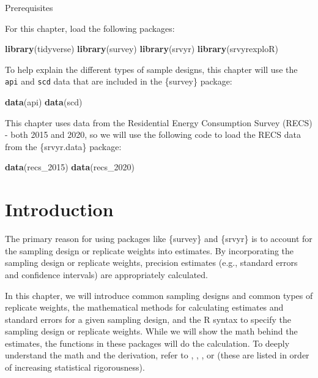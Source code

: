 \documentclass[
]{krantz}
\makeatletter
\newenvironment{Shaded}{\begin{snugshade}}{\end{snugshade}}
\newcommand{\FunctionTok}[1]{\textcolor[rgb]{0.27,0.27,0.27}{\textbf{#1}}}
\newcommand{\NormalTok}[1]{#1}
\newenvironment{kframe}{%
\medskip{}
\setlength{\fboxsep}{.8em}
 \def\at@end@of@kframe{}%
 \ifinner\ifhmode%
  \def\at@end@of@kframe{\end{minipage}}%
  \begin{minipage}{\columnwidth}%
 \fi\fi%
 \def\FrameCommand##1{\hskip\@totalleftmargin \hskip-\fboxsep
 \colorbox{shadecolor}{##1}\hskip-\fboxsep
     \hskip-\linewidth \hskip-\@totalleftmargin \hskip\columnwidth}%
 \MakeFramed {\advance\hsize-\width
   \@totalleftmargin\z@ \linewidth\hsize
   \@setminipage}}%
 {\par\unskip\endMakeFramed%
 \at@end@of@kframe}
\renewenvironment{Shaded}{\begin{kframe}}{\end{kframe}}
\makeatother
\begin{document}
\begin{prereqbox}{Prerequisites}

For this chapter, load the following packages:

\begin{Shaded}
\begin{Highlighting}[]
\FunctionTok{library}\NormalTok{(tidyverse)}
\FunctionTok{library}\NormalTok{(survey)}
\FunctionTok{library}\NormalTok{(srvyr)}
\FunctionTok{library}\NormalTok{(srvyrexploR)}
\end{Highlighting}
\end{Shaded}

To help explain the different types of sample designs, this chapter will use the \texttt{api} and \texttt{scd} data that are included in the \{survey\} package:

\begin{Shaded}
\begin{Highlighting}[]
\FunctionTok{data}\NormalTok{(api)}
\FunctionTok{data}\NormalTok{(scd)}
\end{Highlighting}
\end{Shaded}

This chapter uses data from the Residential Energy Consumption Survey (RECS) - both 2015 and 2020, so we will use the following code to load the RECS data from the \{srvyr.data\} package:

\begin{Shaded}
\begin{Highlighting}[]
\FunctionTok{data}\NormalTok{(recs\_2015)}
\FunctionTok{data}\NormalTok{(recs\_2020)}
\end{Highlighting}
\end{Shaded}

\end{prereqbox}

\hypertarget{introduction-8}{%
\section{Introduction}\label{introduction-8}}

The primary reason for using packages like \{survey\} and \{srvyr\} is to account for the sampling design or replicate weights into estimates. By incorporating the sampling design or replicate weights, precision estimates (e.g., standard errors and confidence intervals) are appropriately calculated.

In this chapter, we will introduce common sampling designs and common types of replicate weights, the mathematical methods for calculating estimates and standard errors for a given sampling design, and the R syntax to specify the sampling design or replicate weights. While we will show the math behind the estimates, the functions in these packages will do the calculation. To deeply understand the math and the derivation, refer to \citet{pennstate506}, \citet{sarndal2003model}, \citet{wolter2007introduction}, or \citet{fuller2011sampling} (these are listed in order of increasing statistical rigorousness).
\end{document}
